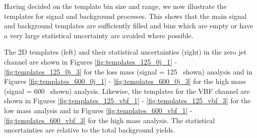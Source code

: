 Having decided on the template bin size and range, we now illustrate
the templates for signal and background processes.  This shows
that the main signal and background templates are sufficiently 
filled and bins which are empty or have a very large statistical
uncertainty are avoided where possible.

The 2D templates (left) and their statistical uncertainties (right) 
in the zero jet channel are shown in 
Figures \ref{fig:templates_125_0j_1} - \ref{fig:templates_125_0j_3}
for the loss mass (signal \mHi = 125 \GeV~shown) analysis and in Figures
\ref{fig:templates_600_0j_1} - \ref{fig:templates_600_0j_3}
for the high mass (signal \mHi = 600 \GeV~shown) analysis.
Likewise, the templates for the VBF channel 
are shown in Figures  \ref{fig:templates_125_vbf_1} - \ref{fig:templates_125_vbf_3}
for the low mass analysis and 
in Figures \ref{fig:templates_600_vbf_1} - \ref{fig:templates_600_vbf_3} 
for the high mass analysis.
The statistical uncertainties are relative to the total background yields.

